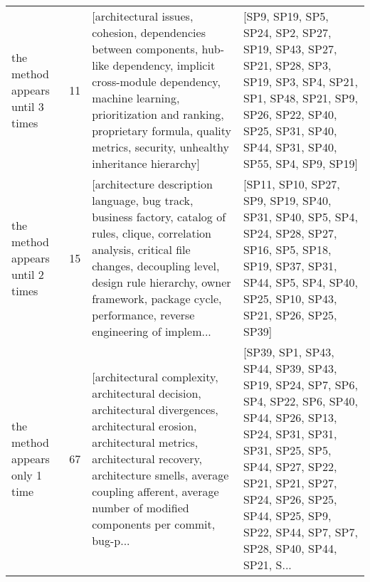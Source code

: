 \begin{tabular}{lrll}
      the method appears until 3 times &     11 &         [architectural issues, cohesion, dependencies between components, hub-like dependency, implicit cross-module dependency, machine learning, prioritization and ranking, proprietary formula, quality metrics, security, unhealthy inheritance hierarchy] &                                                                    [SP9, SP19, SP5, SP24, SP2, SP27, SP19, SP43, SP27, SP21, SP28, SP3, SP19, SP3, SP4, SP21, SP1, SP48, SP21, SP9, SP26, SP22, SP40, SP25, SP31, SP40, SP44, SP31, SP40, SP55, SP4, SP9, SP19] \\
      the method appears until 2 times &     15 &  [architecture description language, bug track, business factory, catalog of rules, clique, correlation analysis, critical file changes, decoupling level, design rule hierarchy, owner framework, package cycle, performance, reverse engineering of implem... &                                                                                  [SP11, SP10, SP27, SP9, SP19, SP40, SP31, SP40, SP5, SP4, SP24, SP28, SP27, SP16, SP5, SP18, SP19, SP37, SP31, SP44, SP5, SP4, SP40, SP25, SP10, SP43, SP21, SP26, SP25, SP39] \\
        the method appears only 1 time &     67 &  [architectural complexity, architectural decision, architectural divergences, architectural erosion, architectural metrics, architectural recovery, architecture smells, average coupling afferent, average number of modified components per commit, bug-p... &  [SP39, SP1, SP43, SP44, SP39, SP43, SP19, SP24, SP7, SP6, SP4, SP22, SP6, SP40, SP44, SP26, SP13, SP24, SP31, SP31, SP31, SP25, SP5, SP44, SP27, SP22, SP21, SP21, SP27, SP24, SP26, SP25, SP44, SP25, SP9, SP22, SP44, SP7, SP7, SP28, SP40, SP44, SP21, S... \\
\bottomrule
\end{tabular}
